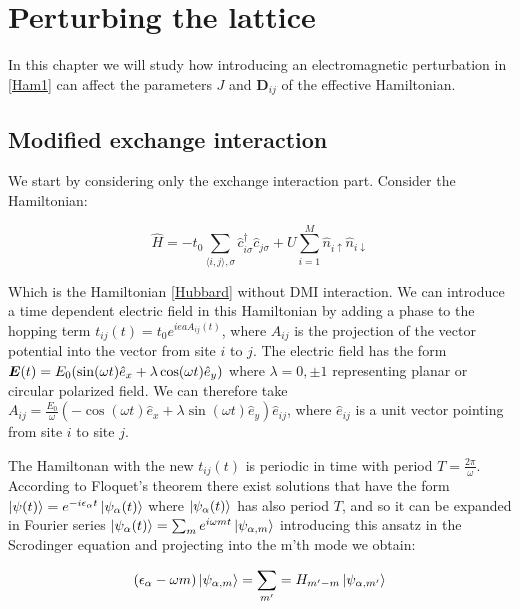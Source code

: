 \chapter{Perturbing the lattice}

In this chapter we will study how introducing an electromagnetic perturbation in \ref{Ham1} can affect the parameters $J$ and $\boldsymbol{D}_{ij}$ of the effective Hamiltonian. 

\section{Modified exchange interaction}

We start by considering only the exchange interaction part. Consider the Hamiltonian:

\begin{equation}
\hat{H} = -t_0\sum_{\langle i,j \rangle, \sigma} \hat{c}_{i \sigma}^\dagger \hat{c}_{j \sigma} + U \sum_{i=1}^M \hat{n}_{i\uparrow}\hat{n}_{i\downarrow}
\end{equation}

Which is the Hamiltonian \ref{Hubbard} without DMI interaction. We can introduce a time dependent electric field in this Hamiltonian by adding a phase to the hopping term $t_{ij}(t) = t_0e^{ieaA_{ij}(t)}$, where $A_{ij}$ is the projection of the vector potential into the vector from site $i$ to $j$. The electric field has the form $\boldsymbol{E}(t) = E_0 (\sin (\omega t) \hat{e}_x + \lambda \cos (\omega t)\hat{e}_y)$ where $\lambda = 0, \pm 1$ representing planar or circular polarized field. We can therefore take $A_{ij} = \frac{E_0}{\omega} (-\cos(\omega t)\hat{e}_x +  \lambda \sin(\omega t)\hat{e}_y)\hat{e}_{ij}$, where $\hat{e}_{ij}$ is a unit vector pointing from site $i$ to site $j$.

The Hamiltonan with the new $t_{ij}(t)$ is periodic in time with period $T=\frac{2\pi}{\omega}$. According to Floquet's theorem there exist solutions that have the form $\ket{\psi(t)} = e^{-i \epsilon_\alpha t} \ket{\psi_\alpha (t)}$ where $\ket{\psi_\alpha(t)}$ has also period $T$, and so it can be expanded in Fourier series $\ket{\psi_\alpha(t)} = \sum_m e^{i\omega mt} \ket{\psi_{\alpha,m}}$ introducing this ansatz in the Scrodinger equation and projecting into the m'th mode we obtain:

\begin{equation}
(\epsilon_\alpha-\omega m) \ket{\psi_{\alpha, m}} = \sum_{m'} = H_{m'-m} \ket{\psi_{\alpha,m'}}
\end{equation}

